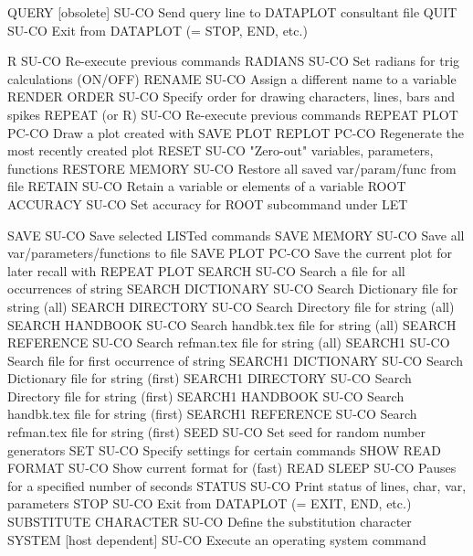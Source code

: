 QUERY       [obsolete]      SU-CO Send query line to DATAPLOT consultant file
QUIT                        SU-CO Exit from DATAPLOT (= STOP, END, etc.)

R                           SU-CO Re-execute previous commands
RADIANS                     SU-CO Set radians for trig calculations (ON/OFF)
RENAME                      SU-CO Assign a different name to a variable
RENDER ORDER                SU-CO Specify order for drawing characters, lines, bars and spikes
REPEAT (or R)               SU-CO Re-execute previous commands
REPEAT PLOT                 PC-CO Draw a plot created with SAVE PLOT
REPLOT                      PC-CO Regenerate the most recently created plot
RESET                       SU-CO "Zero-out" variables, parameters, functions 
RESTORE MEMORY              SU-CO Restore all saved var/param/func from file
RETAIN                      SU-CO Retain a variable or elements of a variable
ROOT ACCURACY               SU-CO Set accuracy for ROOT subcommand under LET

SAVE                        SU-CO Save selected LISTed commands
SAVE MEMORY                 SU-CO Save all var/parameters/functions to file
SAVE PLOT                   PC-CO Save the current plot for later recall with REPEAT PLOT
SEARCH                      SU-CO Search a file for all occurrences of string
SEARCH DICTIONARY           SU-CO Search Dictionary file for string (all)
SEARCH DIRECTORY            SU-CO Search Directory file for string (all)
SEARCH HANDBOOK             SU-CO Search handbk.tex file for string (all)
SEARCH REFERENCE            SU-CO Search refman.tex file for string (all)
SEARCH1                     SU-CO Search file for first occurrence of string
SEARCH1 DICTIONARY          SU-CO Search Dictionary file for string (first)
SEARCH1 DIRECTORY           SU-CO Search Directory file for string (first)
SEARCH1 HANDBOOK            SU-CO Search handbk.tex file for string (first)
SEARCH1 REFERENCE           SU-CO Search refman.tex file for string (first)
SEED                        SU-CO Set seed for random number generators
SET                         SU-CO Specify settings for certain commands
SHOW READ FORMAT            SU-CO Show current format for (fast) READ
SLEEP                       SU-CO Pauses for a specified number of seconds
STATUS                      SU-CO Print status of lines, char, var, parameters
STOP                        SU-CO Exit from DATAPLOT (= EXIT, END, etc.)
SUBSTITUTE CHARACTER        SU-CO Define the substitution character 
SYSTEM [host dependent]     SU-CO Execute an operating system command


